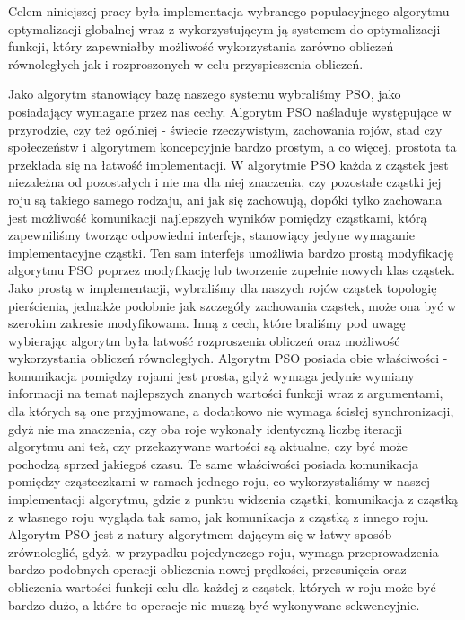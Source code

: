 \documentclass[12pt, twoside, openany, abstract=on]{report}
\theoremstyle{definition}
\begin{document}

Celem niniejszej pracy była implementacja wybranego populacyjnego algorytmu optymalizacji globalnej wraz z wykorzystującym ją systemem do optymalizacji funkcji, który zapewniałby możliwość wykorzystania zarówno obliczeń równoległych jak i rozproszonych w celu przyspieszenia obliczeń.

Jako algorytm stanowiący bazę naszego systemu wybraliśmy PSO, jako posiadający wymagane przez nas cechy.
	Algorytm PSO naśladuje występujące w przyrodzie, czy też ogólniej - świecie rzeczywistym, zachowania rojów, stad czy społeczeństw i algorytmem koncepcyjnie bardzo prostym, a co więcej, prostota ta przekłada się na łatwość implementacji. 
	W algorytmie PSO każda z cząstek jest niezależna od pozostałych i nie ma dla niej znaczenia, czy pozostałe cząstki jej roju są takiego samego rodzaju, ani jak się zachowują, dopóki tylko zachowana jest możliwość komunikacji najlepszych wyników pomiędzy cząstkami, którą zapewniliśmy tworząc odpowiedni interfejs, stanowiący jedyne wymaganie implementacyjne cząstki. 
	Ten sam interfejs umożliwia bardzo prostą modyfikację algorytmu PSO poprzez modyfikację lub tworzenie zupełnie nowych klas cząstek.
	Jako prostą w implementacji, wybraliśmy dla naszych rojów cząstek topologię pierścienia, jednakże podobnie jak szczegóły zachowania cząstek, może ona być w szerokim zakresie modyfikowana.
	Inną z cech, które braliśmy pod uwagę wybierając algorytm była łatwość rozproszenia obliczeń oraz możliwość wykorzystania obliczeń równoległych. 
	Algorytm PSO posiada obie właściwości - komunikacja pomiędzy rojami jest prosta, gdyż wymaga jedynie wymiany informacji na temat najlepszych znanych wartości funkcji wraz z argumentami, dla których są one przyjmowane, a dodatkowo nie wymaga ścisłej synchronizacji, gdyż nie ma znaczenia, czy oba roje wykonały identyczną liczbę iteracji algorytmu ani też, czy przekazywane wartości są aktualne, czy być może pochodzą sprzed jakiegoś czasu. Te same właściwości posiada komunikacja pomiędzy cząsteczkami w ramach jednego roju, co wykorzystaliśmy w naszej implementacji algorytmu, gdzie z punktu widzenia cząstki, komunikacja z cząstką z własnego roju wygląda tak samo, jak komunikacja z cząstką z innego roju.
	Algorytm PSO jest z natury algorytmem dającym się w łatwy sposób zrównoleglić, gdyż, w przypadku pojedynczego roju, wymaga przeprowadzenia bardzo podobnych operacji obliczenia nowej prędkości, przesunięcia oraz obliczenia wartości funkcji celu dla każdej z cząstek, których w roju może być bardzo dużo, a które to operacje nie muszą być wykonywane sekwencyjnie. 
	
\end{document}
